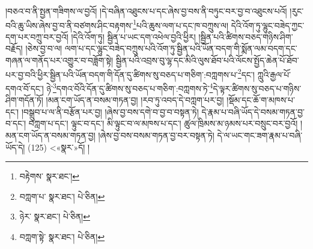 །བཅའ་བ་ནི་སྤྱན་གཟིགས་ལ་བྱའོ། །དེ་བཞིན་འཐུངས་པ་དང་ཞེས་བྱ་བས་ནི་བཏུང་བར་བྱ་བ་འཐུངས་པའོ། །རུང་བའི་ཆུ་ཡིས་ཞེས་བྱ་བ་ནི་བཙགས་ཤིང་བརྟགས་\footnote{བརྟེགས་  སྣར་ཐང་། }པའི་ཆུས་ལག་པ་དང་ཁ་བཀྲུས་ལ། དེའི་འོག་ཏུ་ལྷུང་བཟེད་ཀྱང་དག་པར་བཀྲུ་བར་བྱའོ། །དེའི་འོག་ཏུ། སྦྱིན་པ་ཡང་དག་འཕེལ་བྱའི་ཕྱིར། །སྦྱིན་པའི་ཚིགས་བཅད་གཉིས་ཤིག་བརྗོད། །ཅེས་བྱ་བ་ལ། ལག་པ་དང་ལྷུང་བཟེད་བཀྲུས་པའི་འོག་ཏུ་སྦྱིན་པའི་ཡོན་བདག་གི་སྨོན་ལམ་བདག་དང་གཞན་ལ་གནོད་པར་འགྱུར་བ་བཟློག་སྟེ། སྦྱིན་པའི་འབྲས་བུ་ལྷ་དང་མིའི་ལུས་ཐོབ་པའི་ལོངས་སྤྱོད་ཆེན་པོ་ཐོབ་པར་བྱ་བའི་ཕྱིར་སྦྱིན་པའི་ཡོན་བདག་གི་དོན་དུ་ཚིགས་སུ་བཅད་པ་གཅིག་:བཀླགས་པ་\footnote{བཀླག་པ་  སྣར་ཐང་།  པེ་ཅིན། }དང་། ཀླུའི་རྒྱལ་པོ་དགའ་བོ་དང་། ཉེ་\footnote{ཉེར་  སྣར་ཐང་།  པེ་ཅིན། }དགའ་བོའི་དོན་དུ་ཚིགས་སུ་བཅད་པ་གཅིག་:བཀླགས་ཏེ་\footnote{བཀླག་སྟེ་  སྣར་ཐང་།  པེ་ཅིན། }དེ་ལྟར་ཚིགས་སུ་བཅད་པ་གཉིས་ཤིག་གདོན་ཏོ། །མན་ངག་ཡོད་ན་བསམ་གཏན་བྱ། །རབ་ཏུ་འབད་དེ་བཀླག་པར་བྱ། །སྡོམ་དང་ཆོ་ག་མཁས་པ་དང་། །བསྒྲུབ་པ་ལ་ནི་བརྩོན་པར་བྱ། །ཞེས་བྱ་བས་དགེ་བ་བྱ་བ་བསྟན་ཏེ། དེ་རྣམ་པ་བཞི་ཡོད་དེ་བསམ་གཏན་བྱ་བ་དང་། བཀླག་པ་དང་། ལྟུང་བ་དང་། མི་ལྟུང་བ་ལ་མཁས་པ་དང་། ཚུལ་ཁྲིམས་མ་ཉམས་པར་བསྲུང་བར་བྱའོ། །མན་ངག་ཡོད་ན་བསམ་གཏན་བྱ། །ཞེས་བྱ་བས་བསམ་གཏན་བྱ་བར་བསྟན་ཏེ། དེ་ལ་ཡང་གང་ཟག་རྣམ་པ་བཞི་ཡོད་དེ། (125) <«སྣར་»དོ། །
